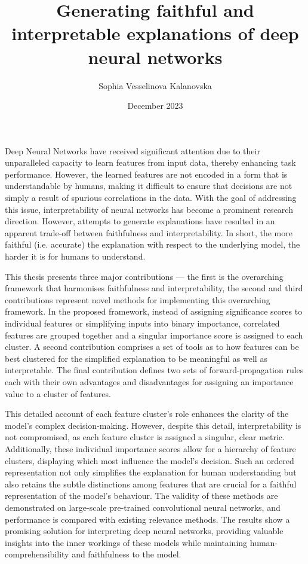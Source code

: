 \documentclass[12pt]{muthesis}
\theoremstyle{definition}
\begin{document}
\title{Generating faithful and interpretable explanations of deep neural networks}
\author{Sophia Vesselinova Kalanovska}
\date{December 2023}
\maketitle


Deep Neural Networks have received significant attention due to their unparalleled capacity to learn features from input data, thereby enhancing task performance. However, the learned features are not encoded in a form that is understandable by humans, making it difficult to ensure that decisions are not simply a result of spurious correlations in the data. With the goal of addressing this issue, interpretability of neural networks has become a prominent research direction. However, attempts to generate explanations have resulted in an apparent trade-off between faithfulness and interpretability. In short, the more faithful (i.e. accurate) the explanation with respect to the underlying model, the harder it is for humans to understand.

\noindent
This thesis presents three major contributions — the first is the overarching framework that harmonises faithfulness and interpretability, the second and third contributions represent novel methods for implementing this overarching framework. In the proposed framework, instead of assigning significance scores to individual features or simplifying inputs into binary importance, correlated features are grouped together and a singular importance score is assigned to each cluster. A second contribution comprises a set of tools as to how features can be best clustered for the simplified explanation to be meaningful as well as interpretable. The final contribution defines two sets of forward-propagation rules each with their own advantages and disadvantages for assigning an importance value to a cluster of features.

\noindent
This detailed account of each feature cluster’s role enhances the clarity of the model's complex decision-making. However, despite this detail, interpretability is not compromised, as each feature cluster is assigned a singular, clear metric. Additionally, these individual importance scores allow for a hierarchy of feature clusters, displaying which most influence the model's decision. Such an ordered representation not only simplifies the explanation for human understanding but also retains the subtle distinctions among features that are crucial for a faithful representation of the model's behaviour. The validity of these methods are demonstrated on large-scale pre-trained convolutional neural networks, and performance is compared with existing relevance methods. The results show a promising solution for interpreting deep neural networks, providing valuable insights into the inner workings of these models while maintaining human-comprehensibility and faithfulness to the model.
\end{document}
